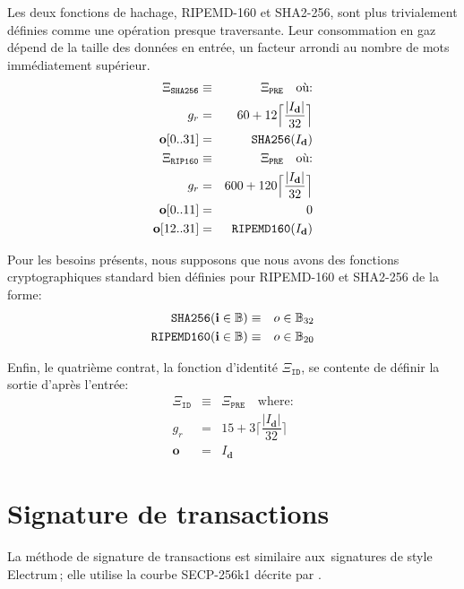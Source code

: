 \documentclass[9pt,oneside]{amsart}
\begin{document}
Les deux fonctions de hachage, RIPEMD-160 et SHA2-256, sont plus trivialement définies comme une opération presque traversante. Leur consommation en gaz dépend de la taille des données en entrée, un facteur arrondi au nombre de mots immédiatement supérieur.
\begin{eqnarray}
\Xi_{\mathtt{SHA256}} &\equiv& \Xi_{\mathtt{PRE}} \quad \text{où:} \\
g_r &=& 60 + 12\Big\lceil \dfrac{|I_\mathbf{d}|}{32} \Big\rceil\\
\mathbf{o}[0..31] &=& \mathtt{\tiny SHA256}(I_\mathbf{d})\\
\Xi_{\mathtt{RIP160}} &\equiv& \Xi_{\mathtt{PRE}} \quad \text{où:} \\
g_r &=& 600 + 120\Big\lceil \dfrac{|I_\mathbf{d}|}{32} \Big\rceil\\
\mathbf{o}[0..11] &=& 0 \\
\mathbf{o}[12..31] &=& \mathtt{\tiny RIPEMD160}(I_\mathbf{d})\\
\end{eqnarray}

Pour les besoins présents, nous supposons que nous avons des fonctions cryptographiques standard bien définies pour RIPEMD-160 et SHA2-256 de la forme:
\begin{eqnarray}
\mathtt{\small SHA256}(\mathbf{i} \in \mathbb{B}) & \equiv & o \in \mathbb{B}_{32} \\
\mathtt{\small RIPEMD160}(\mathbf{i} \in \mathbb{B}) & \equiv & o \in \mathbb{B}_{20}
\end{eqnarray}

Enfin, le quatrième contrat, la fonction d'identité $\Xi_{\mathtt{ID}}$, se contente de définir la sortie d'après l'entrée:
\begin{eqnarray}
\Xi_{\mathtt{ID}} &\equiv& \Xi_{\mathtt{PRE}} \quad \text{where:} \\
g_r &=& 15 + 3\Big\lceil \dfrac{|I_\mathbf{d}|}{32} \Big\rceil\\
\mathbf{o} &=& I_\mathbf{d}
\end{eqnarray}


\section{Signature de transactions}\label{app:signing}

La méthode de signature de transactions est similaire aux \guillemotleft\,signatures de style Electrum\,\guillemotright; elle utilise la courbe SECP-256k1 décrite par \cite{gura2004comparing}.
\end{document}
